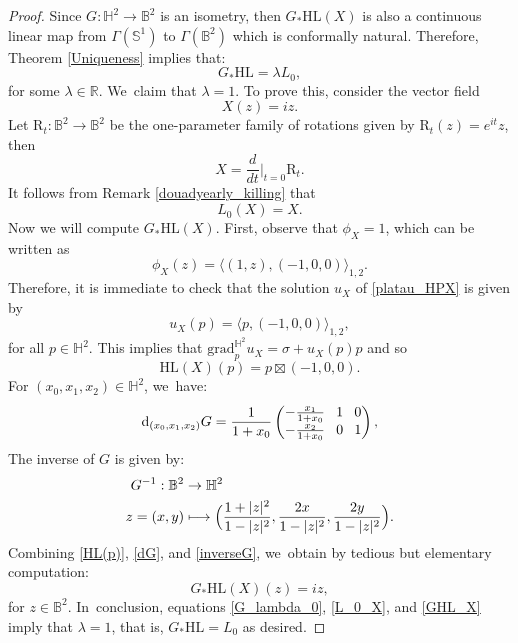\documentclass[JEP,XML,SOM,Unicode,NoEqCountersInSection, NoFloatCountersInSection,published]{cedram}
\newcommand\mto{\mathchoice{\longmapsto}{\mapsto}{\mapsto}{\mapsto}}
\theoremstyle{plain}
\theoremstyle{definition}
\newcommand{\grad}{\mathrm{grad}^{\mathbb{H}^2}}
\begin{document}
\begin{proof}
Since \(G:\mathbb{H}^2 \to \mathbb{B}^2\) is an isometry, then \(G_*\mathrm{HL}(X)\) is also a continuous linear map from \(\Gamma(\mathbb{S}^1)\) to \(\Gamma(\mathbb{B}^2)\) which is conformally natural. Therefore, Theorem \ref{Uniqueness} implies that:
\begin{equation}\label{G_lambda_0}
G_*\mathrm{HL} = \lambda L_0,
\end{equation}
for some \(\lambda \in \mathbb{R}\). We~claim that \(\lambda = 1\). To prove this, consider the vector field
\[ X(z) = iz. \]
Let \(\mathrm{R}_t:\mathbb{B}^2 \to \mathbb{B}^2\) be the one-parameter family of rotations given by \(\mathrm{R}_t(z) = e^{it}z\), then
\[ X = \frac{d}{dt}\Big\lvert_{t=0}\mathrm{R}_t. \]
It follows from Remark \ref{douadyearly_killing} that
\begin{equation}\label{L_0_X}
L_0(X) = X.
\end{equation}
Now we will compute \(G_*\mathrm{HL}(X)\). First, observe that \(\phi_X = 1\), which can be written as
\[ \phi_X(z) = \langle (1,z), (-1,0,0) \rangle_{1,2}. \]
Therefore, it is immediate to check that the solution \(u_X\) of \eqref{platau_HPX} is given by
\[ u_X(p) = \langle p, (-1,0,0) \rangle_{1,2}, \]
for all \(p \in \mathbb{H}^2\). This implies that \(\grad_p u_X = \sigma + u_X(p) p\) and so
\begin{equation}\label{HL(p)}
\mathrm{HL}(X)(p) = p \boxtimes (-1,0,0).
\end{equation}
For \((x_0,x_1,x_2) \in \mathbb{H}^2\), we~have:
\begin{equation}\label{dG}
\arraycolsep4pt
\mathrm{d}_{(x_0,x_1,x_2)}G = \frac{1}{1 + x_0} \begin{pmatrix}
-\frac{x_1}{1 + x_0} & 1 & 0 \\
-\frac{x_2}{1 + x_0} & 0 & 1
\end{pmatrix},
\end{equation}
The inverse of \(G\) is given by:
\begin{equation}\label{inverseG}
\begin{aligned}
G^{-1}:\mathbb{B}^2 & \to \mathbb{H}^2 \\
z = (x,y) & \mto\Bigl(\frac{1 + \lvert z \rvert^2}{1 - \lvert z \rvert^2}, \frac{2x}{1 - \lvert z \rvert^2}, \frac{2y}{1 - \lvert z \rvert^2} \Bigr).
\end{aligned}
\end{equation}
Combining \eqref{HL(p)}, \eqref{dG}, and \eqref{inverseG}, we~obtain by tedious but elementary computation:
\begin{equation}\label{GHL_X}
G_*\mathrm{HL}(X)(z) = iz,
\end{equation}
for \(z \in \mathbb{B}^2\). In~conclusion, equations \eqref{G_lambda_0}, \eqref{L_0_X}, and \eqref{GHL_X} imply that \(\lambda = 1\), that is, \(G_*\mathrm{HL} = L_0\) as desired.
\end{proof}
\end{document}
